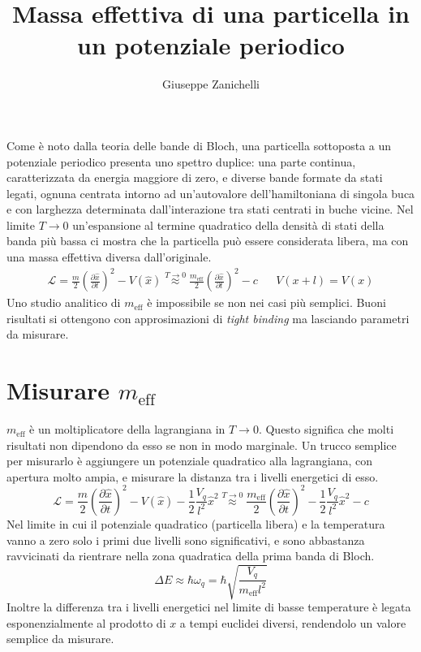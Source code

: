 \documentclass[italian]{article}
\title{Massa effettiva di una particella in un potenziale periodico}
\author{Giuseppe Zanichelli}
\newcommand{\approxusing}[1]{\stackrel{#1}{\approx}}
\newcommand{\lagrangian}{\mathcal{L}}
\newcommand{\ox}{\hat{x}}
\newcommand{\meff}{m_{\mathrm{eff}}}
\newcommand{\deriv}[2]{\frac{\partial #1}{\partial #2}}
\begin{document}
    Come è noto dalla teoria delle bande di Bloch, una particella sottoposta a un potenziale periodico presenta uno spettro duplice: una parte continua, caratterizzata da energia maggiore di zero, e diverse bande formate da stati legati, ognuna centrata intorno ad un'autovalore dell'hamiltoniana di singola buca e con larghezza determinata dall'interazione tra stati centrati in buche vicine.
    Nel limite $T\to0$ un'espansione al termine quadratico della densità di stati della banda più bassa ci mostra che la particella può essere considerata libera, ma con una massa effettiva diversa dall'originale.
    \begin{align}
        \lagrangian = \frac{m}{2}\left(\deriv{\ox}{t}\right)^2 - V(\ox) \approxusing{T \to 0} \frac{\meff}{2}\left(\deriv{\ox}{t}\right)^2 - c && V(x+l) = V(x) 
    \end{align}
    Uno studio analitico di $\meff$ è impossibile se non nei casi più semplici. Buoni risultati si ottengono con approsimazioni di \textit{tight binding} ma lasciando parametri da misurare. 
    
\section{Misurare $\meff$}

    $\meff$ è un moltiplicatore della lagrangiana in $T\to0$. Questo significa che molti risultati non dipendono da esso se non in modo marginale. Un trucco semplice per misurarlo è aggiungere un potenziale quadratico alla lagrangiana, con apertura molto ampia, e misurare la distanza tra i livelli energetici di esso.
    \begin{equation}
        \lagrangian = \frac{m}{2}\left(\deriv{\ox}{t}\right)^2 - V(\ox) - \frac{1}{2} \frac{V_q}{l^2} \ox^2 \approxusing{T \to 0} \frac{\meff}{2}\left(\deriv{\ox}{t}\right)^2- \frac{1}{2} \frac{V_q}{l^2} \ox^2 - c
    \end{equation}
    Nel limite in cui il potenziale quadratico (particella libera) e la temperatura vanno a zero solo i primi due livelli sono significativi, e sono abbastanza ravvicinati da rientrare nella zona quadratica della prima banda di Bloch.
    \begin{equation} \label{eq:meff_from_gap}
        \Delta E \approx \hbar \omega_q = \hbar \sqrt{\frac{V_q}{\meff l^2}}
    \end{equation}
    Inoltre la differenza tra i livelli energetici nel limite di basse temperature è legata esponenzialmente al prodotto di $x$ a tempi euclidei diversi, rendendolo un valore semplice da misurare.
    
\end{document}

